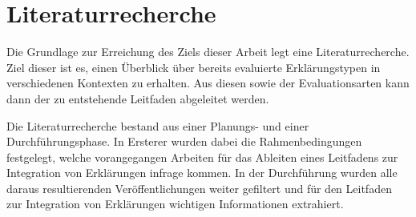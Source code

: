 \chapter{Literaturrecherche}
\label{sec:literature_review}

Die Grundlage zur Erreichung des Ziels dieser Arbeit legt eine Literaturrecherche. Ziel dieser ist es, einen Überblick über bereits evaluierte Erklärungstypen in verschiedenen Kontexten zu erhalten. Aus diesen sowie der Evaluationsarten kann dann der zu entstehende Leitfaden abgeleitet werden.

Die Literaturrecherche bestand aus einer Planungs- und einer Durchführungsphase. In Ersterer wurden dabei die Rahmenbedingungen festgelegt, welche vorangegangen Arbeiten für das Ableiten eines Leitfadens zur Integration von Erklärungen infrage kommen. In der Durchführung wurden alle daraus resultierenden Veröffentlichungen weiter gefiltert und für den Leitfaden zur Integration von Erklärungen wichtigen Informationen extrahiert.





